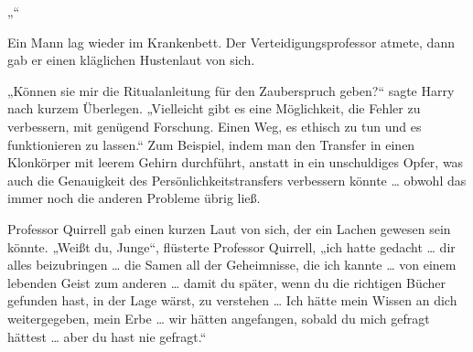 „“

Ein Mann lag wieder im Krankenbett. Der Verteidigungsprofessor atmete, dann gab er einen kläglichen Hustenlaut von sich.

„Können sie mir die Ritualanleitung für den Zauberspruch geben?“ sagte Harry nach kurzem Überlegen.
„Vielleicht gibt es eine Möglichkeit, die Fehler zu verbessern, mit genügend Forschung. Einen Weg, es ethisch zu tun und es funktionieren zu lassen.“
Zum Beispiel, indem man den Transfer in einen Klonkörper mit leerem Gehirn durchführt, anstatt in ein unschuldiges Opfer, was auch die Genauigkeit des Persönlichkeitstransfers verbessern könnte … obwohl das immer noch die anderen Probleme übrig ließ.

Professor Quirrell gab einen kurzen Laut von sich, der ein Lachen gewesen sein könnte.
„Weißt du, Junge“, flüsterte Professor Quirrell, „ich hatte gedacht … dir alles beizubringen … die Samen all der Geheimnisse, die ich kannte … von einem lebenden Geist zum anderen … damit du später, wenn du die richtigen Bücher gefunden hast, in der Lage wärst, zu verstehen … Ich hätte mein Wissen an dich weitergegeben, mein Erbe … wir hätten angefangen, sobald du mich gefragt hättest … aber du hast nie gefragt.“

